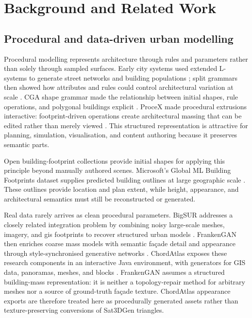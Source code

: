 \chapter{Background and Related Work} \label{Chap2}\label{chap:background}

\section{Procedural and data-driven urban modelling}

Procedural modelling represents architecture through rules and parameters
rather than solely through sampled surfaces.  Early city systems used extended
L-systems to generate street networks and building populations
\cite{parish2001procedural}; split grammars then showed how attributes and
rules could control architectural variation at scale \cite{wonka2003instant}.
CGA shape grammar made the relationship between initial shapes, rule
operations, and polygonal buildings explicit \cite{muller2006procedural}.
ProceX made procedural extrusions
interactive: footprint-driven operations create architectural massing that can
be edited rather than merely viewed \cite{kelly2011procex}.  This structured
representation is attractive for planning, simulation, visualisation, and
content authoring because it preserves semantic parts.

Open building-footprint collections provide initial shapes for applying this
principle beyond manually authored scenes.  Microsoft's Global ML Building
Footprints dataset supplies predicted building outlines at large geographic
scale \cite{microsoftGlobalFootprints2026}.  These outlines provide location
and plan extent, while height, appearance, and architectural semantics must
still be reconstructed or generated.

Real data rarely arrives as clean procedural parameters.  BigSUR addresses a
closely related integration problem by combining noisy large-scale meshes,
imagery, and \gls{gis} footprints to recover structured urban models
\cite{kelly2017bigsur}.  FrankenGAN then enriches coarse mass models with
semantic fa\c{c}ade detail and appearance through style-synchronised generative
networks \cite{kelly2018frankengan}.  ChordAtlas exposes these research
components in an interactive Java environment, with generators for GIS data,
panoramas, meshes, and blocks \cite{kellyChordAtlas2024}.  FrankenGAN assumes a
structured building-mass representation: it is neither a topology-repair
method for arbitrary meshes nor a source of ground-truth fa\c{c}ade texture.
ChordAtlas appearance exports are therefore treated here as procedurally
generated assets rather than texture-preserving conversions of Sat3DGen
triangles.

